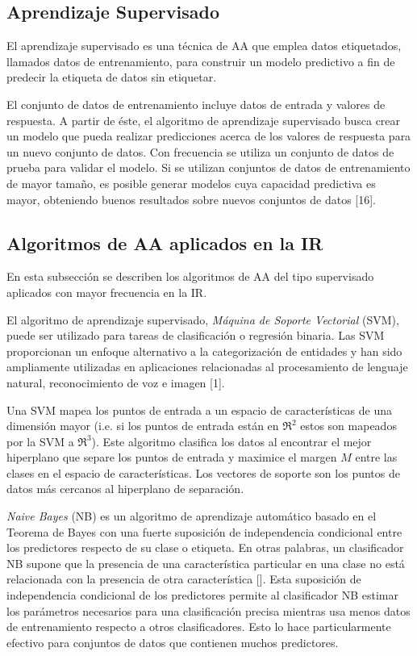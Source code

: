 \documentclass[journal]{IEEEtran}
\begin{document}
\subsection{Aprendizaje Supervisado}

El aprendizaje supervisado es una técnica de AA que emplea datos etiquetados, llamados datos de entrenamiento, para construir un modelo predictivo a fin de predecir la etiqueta de datos sin etiquetar.

El conjunto de datos de entrenamiento incluye datos de entrada y valores de respuesta. A partir de éste, el algoritmo de aprendizaje supervisado busca crear un modelo que pueda realizar predicciones acerca de los valores de respuesta para un nuevo conjunto de datos. Con frecuencia se utiliza un conjunto de datos de prueba para validar el modelo. Si se utilizan conjuntos de datos de entrenamiento de mayor tamaño, es posible generar modelos cuya capacidad predictiva es mayor, obteniendo buenos resultados sobre nuevos conjuntos de datos \cite{Darnstadt2014}[16].

\subsection{Algoritmos de AA aplicados en la IR}

En esta subsección se describen los algoritmos de AA del tipo supervisado aplicados con mayor frecuencia en la IR. 

El algoritmo de aprendizaje supervisado, \textit{Máquina de Soporte Vectorial} (SVM), puede ser utilizado para tareas de clasificación o regresión binaria. Las SVM proporcionan un enfoque alternativo a la categorización de entidades y han sido ampliamente utilizadas en aplicaciones relacionadas al procesamiento de lenguaje natural, reconocimiento de voz e imagen \cite{Asghar2010}[1].

Una SVM mapea los puntos de entrada a un espacio de características de una dimensión mayor (i.e. si los puntos de entrada están en \(ℜ^2\) estos son mapeados por la SVM a \(ℜ^3\)). Este algoritmo clasifica los datos al encontrar el mejor hiperplano que separe los puntos de entrada y maximice el margen \( M \) entre las clases en el espacio de características.  Los vectores de soporte son los puntos de datos más cercanos al hiperplano de separación.

\textit{Naive Bayes} (NB) es un algoritmo de aprendizaje automático basado en el Teorema de Bayes con una fuerte suposición de independencia condicional entre los predictores respecto de su clase o etiqueta. En otras palabras, un clasificador NB supone que la presencia de una característica particular en una clase no está relacionada con la presencia de otra característica []. Esta suposición de independencia condicional de los predictores permite al clasificador NB estimar los parámetros necesarios para una clasificación precisa mientras usa menos datos de entrenamiento respecto a otros clasificadores. Esto lo hace particularmente efectivo para conjuntos de datos que contienen muchos predictores. 
\end{document}
